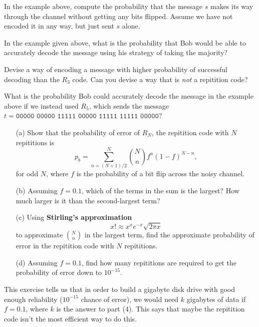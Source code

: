 \documentclass{article}
\begin{document}
\begin{exercise}
    In the example above, compute the probability that the message \(s\) makes its way through the channel without getting any bits flipped. Assume we have not encoded it in any way, but just sent \(s\) alone.
\end{exercise}

\begin{exercise}
    In the example given above, what is the probability that Bob would be able to accurately decode the message using his strategy of taking the majority?
\end{exercise}

\begin{exercise}
    Devise a way of encoding a message with higher probability of successful decoding than the \(R_3\) code.
    Can you devise a way that is \textit{not} a repitition code?
\end{exercise}

\begin{exercise}
    What is the probability Bob could accurately decode the message in the example above if we instead used \(R_5\), which sends the message \(t = \texttt{00000 00000 11111 00000 11111 11111 00000}\)?
\end{exercise}

\begin{exercise}
    \begin{enumerate}
        \item[(a)] Show that the probability of error of \(R_N\), the repitition code with \(N\) repititions is 
        \[p_b = \sum_{n=(N+1)/2}^N\binom{N}{n}f^n(1-f)^{N-n},\]
        for odd \(N\), where \(f\) is the probability of a bit flip across the noisy channel.
        \item[(b)] Assuming \(f=0.1\), which of the terms in the sum is the largest?
        How much larger is it than the second-largest term?
        \item[(c)] Using \textbf{Stirling's approximation}
        \[x! \approx x^xe^{-x}\sqrt{2\pi x}\]
        to approximate \(\binom{N}{n}\) in the largest term, find the approximate probability of error in the repitition code with \(N\) repititions.
        \item[(d)] Assuming \(f=0.1\), find how many repititions are required to get the probability of error down to \(10^{-15}\).
    \end{enumerate}
    This exercise tells us that in order to build a gigabyte disk drive with good enough reliability (\(10^{-15}\) chance of error), we would need \(k\) gigabytes of data if \(f=0.1\), where \(k\) is the answer to part (4). 
    This says that maybe the repitition code isn't the most efficient way to do this.
\end{exercise}
\end{document}

